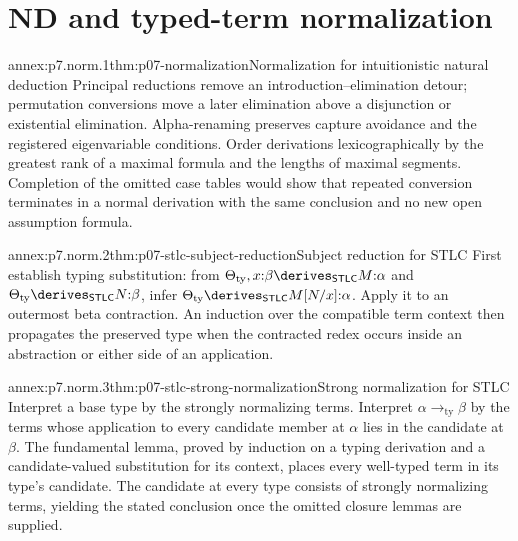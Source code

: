 
\section{ND and typed-term normalization}

\begin{annexitem}{annex:p7.norm.1}{thm:p07-normalization}{Normalization for intuitionistic natural deduction}
Principal reductions remove an introduction--elimination detour; permutation
conversions move a later elimination above a disjunction or existential
elimination.  Alpha-renaming preserves capture avoidance and the registered
eigenvariable conditions.  Order derivations lexicographically by the
greatest rank of a maximal formula and the lengths of maximal segments.
Completion of the omitted case tables would show that repeated conversion
terminates in a normal derivation with the same conclusion and no new open
assumption formula.
\end{annexitem}

\begin{annexitem}{annex:p7.norm.2}{thm:p07-stlc-subject-reduction}{Subject reduction for STLC}
First establish typing substitution: from
\(\Theta_{\mathrm{ty}},x{:}\beta
 \derives_{\mathsf{STLC}}M{:}\alpha\) and
\(\Theta_{\mathrm{ty}}\derives_{\mathsf{STLC}}N{:}\beta\), infer
\(\Theta_{\mathrm{ty}}\derives_{\mathsf{STLC}}M[N/x]{:}\alpha\).
Apply it to an outermost beta contraction.  An induction over the compatible
term context then propagates the preserved type when the contracted redex
occurs inside an abstraction or either side of an application.
\end{annexitem}

\begin{annexitem}{annex:p7.norm.3}{thm:p07-stlc-strong-normalization}{Strong normalization for STLC}
Interpret a base type by the strongly normalizing terms.  Interpret
\(\alpha\mathbin{\to_{\mathrm{ty}}}\beta\) by the terms whose application to
every candidate member at \(\alpha\) lies in the candidate at \(\beta\).
The fundamental lemma, proved by induction on a typing derivation and a
candidate-valued substitution for its context, places every well-typed term
in its type's candidate.  The candidate at every type consists of strongly
normalizing terms, yielding the stated conclusion once the omitted closure
lemmas are supplied.
\end{annexitem}
